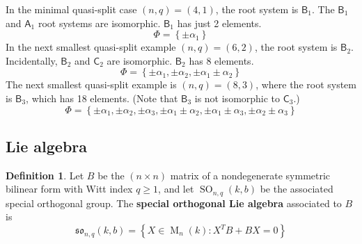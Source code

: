 \documentclass[12pt]{article}
\theoremstyle{definition}
\newtheorem{definition}[theorem]{Definition}
\newcommand{\lb}{\left\{}
\newcommand{\rb}{\right\}}
\newcommand{\tbf}{\textbf}
\DeclareMathOperator{\M}{M}
\DeclareMathOperator{\SO}{SO}
\begin{document}
In the minimal quasi-split case $(n,q) = (4,1)$, the root system is $\mathsf{B}_1$. The $\mathsf{B}_1$ and $\mathsf{A}_1$ root systems are isomorphic. $\mathsf{B}_1$ has just 2 elements.
\[
	\Phi = \lb \pm \alpha_1 \rb
\]
In the next smallest quasi-split example $(n,q) = (6,2)$, the root system is $\mathsf{B}_2$. Incidentally, $\mathsf{B}_2$ and $\mathsf{C}_2$ are isomorphic. $\mathsf{B}_2$ has 8 elements.
\[
	\Phi = \lb \pm \alpha_1, \pm \alpha_2, \pm \alpha_1 \pm \alpha_2 \rb
\]
The next smallest quasi-split example is $(n,q) = (8,3)$, where the root system is $\mathsf{B}_3$, which has 18 elements. (Note that $\mathsf{B}_3$ is not isomorphic to $\mathsf{C}_3$.)
\[
	\Phi = \lb \pm \alpha_1, \pm \alpha_2, \pm \alpha_3, \pm \alpha_1 \pm \alpha_2, \pm \alpha_1 \pm \alpha_3, \pm \alpha_2 \pm \alpha_3 \rb
\]

\subsection{Lie algebra}

\begin{definition}
Let $B$ be the $(n \times n)$ matrix of a nondegenerate symmetric bilinear form with Witt index $q \ge 1$, and let $\SO_{n,q}(k,b)$ be the associated special orthogonal group. The \tbf{special orthogonal Lie algebra} associated to $B$ is
\[
	\mathfrak{so}_{n,q}(k,b) = \lb X \in \M_n(k) : X^T B + BX = 0 \rb
\]
\end{definition}
\end{document}
